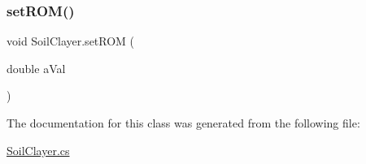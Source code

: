 \mbox{\label{class_soil_clayer_a7688815873c1b9759a1701539b905883}} 
\subsubsection{\texorpdfstring{setROM()}{setROM()}}
{\footnotesize\ttfamily void Soil\+Clayer.\+set\+R\+OM (\begin{DoxyParamCaption}\item[{double}]{a\+Val }\end{DoxyParamCaption})\hspace{0.3cm}{\ttfamily [inline]}}



The documentation for this class was generated from the following file\+:\begin{DoxyCompactItemize}
\item 
\mbox{\hyperlink{_soil_clayer_8cs}{Soil\+Clayer.\+cs}}\end{DoxyCompactItemize}
